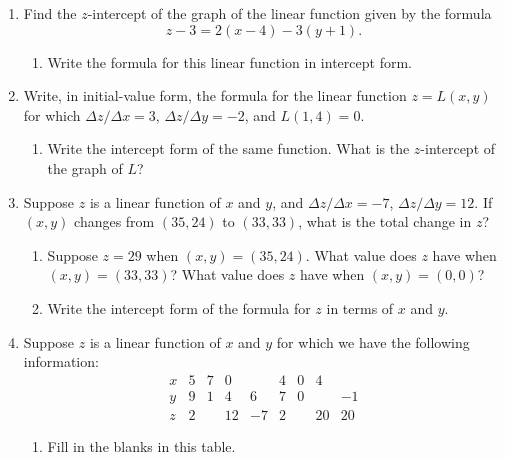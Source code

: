 \begin{enumerate}
\item Find the $z$-intercept of the graph of the linear function given
by the formula
	\[
z - 3 = 2 (x - 4) - 3 (y + 1).
\]


  \begin{enumerate}
  \item Write the formula for this linear function in intercept form.


\end{enumerate}
\item Write, in initial-value form, the formula for the linear
function $z = L(x, y)$ for which $\Delta z/\Delta x = 3$, $\Delta
z/\Delta y = -2$, and $L(1, 4) = 0$.

  \begin{enumerate}
  \item Write the intercept form of the same function.  What is the
$z$-intercept of the graph of $L$?


\end{enumerate}
\item Suppose $z$ is a linear function of $x$ and $y$, and $\Delta
z/\Delta x = -7$, $\Delta z/\Delta y = 12$.  If $(x, y)$ changes from
$(35, 24)$ to $(33, 33)$, what is the total change in $z$?

  \begin{enumerate}
  \item Suppose $z = 29$ when $(x, y) = (35, 24)$.  What value does $z$
have when $(x, y) = (33, 33)$?  What value does $z$ have when $(x, y)
= (0, 0)$?

  \item Write the intercept form of the formula for $z$ in terms of $x$ and $y$.



\end{enumerate}
\item Suppose $z$ is a linear function of $x$ and $y$ for which we have
the following information: \addtolength{\arraycolsep}{8pt}
	\[
\begin{array}{r||r|r|r|r|r|r|r|r}
	x  &  5  &  7  &  0  &     &  4  &  0  &  4  &    \\
	\hline 
	y  &  9  &  1  &  4  &  6  &  7  &  0  &     &  -1 \\
	\hline \hline 
	z  &  2  &     & 12  & -7  &  2  &     &  20 &  20 
	\end{array}
\]
\addtolength{\arraycolsep}{-8pt}


  \begin{enumerate}
  \item Fill in the blanks in this table.


\end{enumerate}
\end{enumerate}
